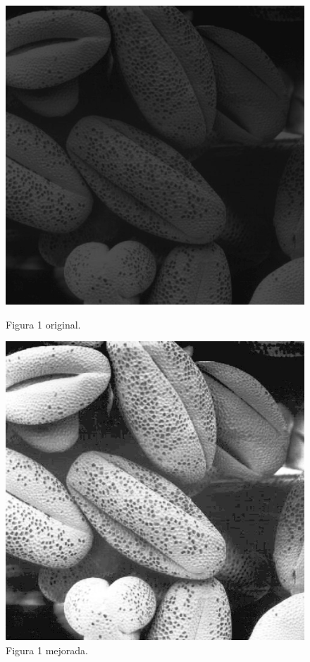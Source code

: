 \documentclass[11pt, letterpaper]{article}
\begin{document}
	
\begin{figure}[h]
		\centering
		\begin{minipage}{0.45\textwidth}
			\centering
			\includegraphics[width=\textwidth]{IMG/Fig3.15(a)1.jpg}
			\caption{Figura 1 original.}
			\label{fig:f5}
		\end{minipage}\hfill
		\begin{minipage}{0.45\textwidth}
			\centering
			\includegraphics[width=\textwidth]{RESULTADOS/img15.png}
			\caption{Figura 1 mejorada.}
			\label{fig:f6}
		\end{minipage}
		

\end{figure}
\end{document}
